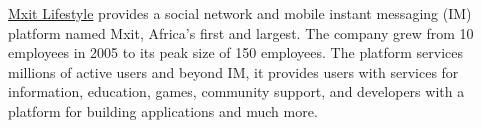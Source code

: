 \documentclass[10pt,a4paper,final]{columncv}
\begin{document}
\noindent \href{http://www.mxit.com/}{Mxit Lifestyle} provides a social network and mobile 
          instant messaging (IM) platform named Mxit, Africa's first and largest. The 
          company grew from 10 employees in 2005 to its peak size of 150 
          employees. The platform services millions of active users and beyond IM,
          it provides users with services for information, education, games, community 
          support, and developers with a platform for building applications and much more. 
\\[-3em]

\begin{cvenv}
  \cvitem{}{} %
  

\end{cvenv}
\end{document}
